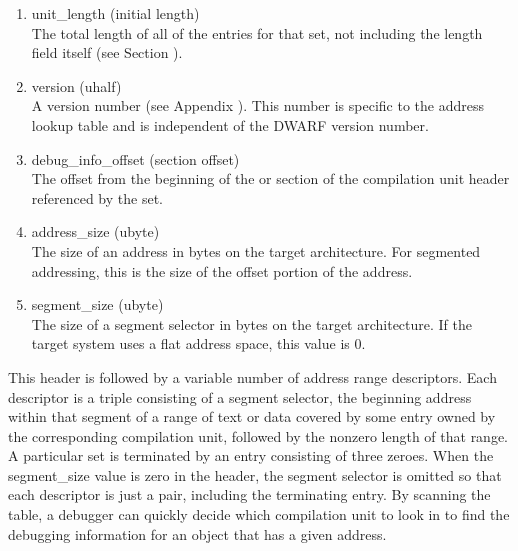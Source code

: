 \begin{enumerate}[1.]

\item unit\_length (initial length) \\
The total length of all of the
entries for that set, not including the length field itself
(see Section ).

\item version (uhalf) \\
A version number 
(see Appendix ). 
This number is specific to the address lookup table and is
independent of the DWARF version number.

\item debug\_info\_offset (section offset) \\
The offset from the
beginning of the  or 
 section of the
compilation unit header referenced by the set.

\item address\_size (ubyte) \\
The size of an address in bytes on
the target architecture. For 
segmented addressing, this is
the size of the offset portion of the address.

\item segment\_size (ubyte) \\
The size of a segment selector in
bytes on the target architecture. If the target system uses
a flat address space, this value is 0.

\end{enumerate}


This header is followed by a variable number of address range
descriptors. Each descriptor is a triple consisting of a
segment selector, the beginning address within that segment
of a range of text or data covered by some entry owned by
the corresponding compilation unit, followed by the non\dash zero
length of that range. A particular set is terminated by an
entry consisting of three zeroes. When the segment\_size value
is zero in the header, the segment selector is omitted so that
each descriptor is just a pair, including the terminating
entry. By scanning the table, a debugger can quickly decide
which compilation unit to look in to find the debugging
information for an object that has a given address.

